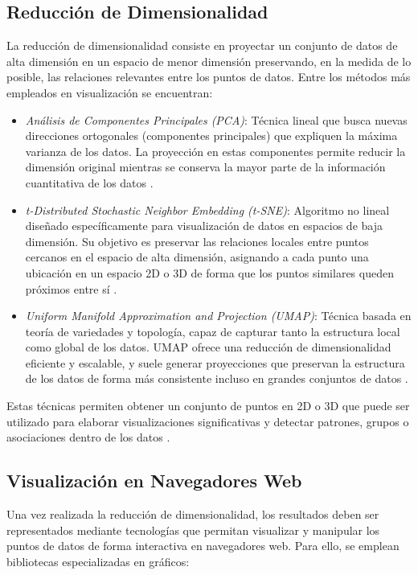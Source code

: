 \documentclass{article}
\begin{document}
\subsection{Reducción de Dimensionalidad}

La reducción de dimensionalidad consiste en proyectar un conjunto de datos de alta dimensión en un espacio de menor dimensión preservando, en la medida de lo posible, las relaciones relevantes entre los puntos de datos. Entre los métodos más empleados en visualización se encuentran:

\begin{itemize}
    \item \textit{Análisis de Componentes Principales (PCA)}: Técnica lineal que busca nuevas direcciones ortogonales (componentes principales) que expliquen la máxima varianza de los datos. La proyección en estas componentes permite reducir la dimensión original mientras se conserva la mayor parte de la información cuantitativa de los datos .
    \item \textit{t-Distributed Stochastic Neighbor Embedding (t-SNE)}: Algoritmo no lineal diseñado específicamente para visualización de datos en espacios de baja dimensión. Su objetivo es preservar las relaciones locales entre puntos cercanos en el espacio de alta dimensión, asignando a cada punto una ubicación en un espacio 2D o 3D de forma que los puntos similares queden próximos entre sí .
    \item \textit{Uniform Manifold Approximation and Projection (UMAP)}: Técnica basada en teoría de variedades y topología, capaz de capturar tanto la estructura local como global de los datos. UMAP ofrece una reducción de dimensionalidad eficiente y escalable, y suele generar proyecciones que preservan la estructura de los datos de forma más consistente incluso en grandes conjuntos de datos .
\end{itemize}

Estas técnicas permiten obtener un conjunto de puntos en 2D o 3D que puede ser utilizado para elaborar visualizaciones significativas y detectar patrones, grupos o asociaciones dentro de los datos .

\subsection{Visualización en Navegadores Web}

Una vez realizada la reducción de dimensionalidad, los resultados deben ser representados mediante tecnologías que permitan visualizar y manipular los puntos de datos de forma interactiva en navegadores web. Para ello, se emplean bibliotecas especializadas en gráficos:
\end{document}

